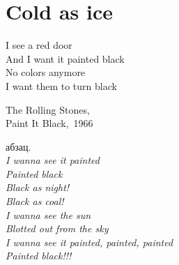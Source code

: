 \chapter{Cold as ice} 

\setlength{\epigraphwidth}{0.45\textwidth}

\epigraph{%
	I see a red door \\
	And I want it painted black \\
	No colors anymore \\
	I want them to turn black }
	{
	\begin{flushright}
		\small{The Rolling Stones,\\Paint It Black,~1966}
	\end{flushright}
	}


абзац.\\
\textit{
\hspace*{35mm} I wanna see it painted\\
\hspace*{35mm} Painted black\\
\hspace*{35mm} Black as night!\\
\hspace*{35mm} Black as coal!\\
\hspace*{35mm} I wanna see the sun\\
\hspace*{35mm} Blotted out from the sky\\
\hspace*{35mm} I wanna see it painted, painted, painted\\
\hspace*{35mm} Painted black!!!
}
\begin{center}
\end{center}
